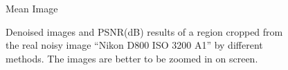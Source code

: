 \begin{figure}
{\begin{minipage}[t]{0.19\textwidth}
{\footnotesize Mean Image}
\end{minipage}
} 
    \caption{Denoised images and PSNR(dB) results of a region cropped from the real noisy image ``Nikon D800 ISO 3200 A1'' \cite{crosschannel2016} by different methods. The images are better to be zoomed in on screen.}
    \label{fig3-17}
\end{figure}

\begin{figure}
    \centering
{}
\end{figure}

